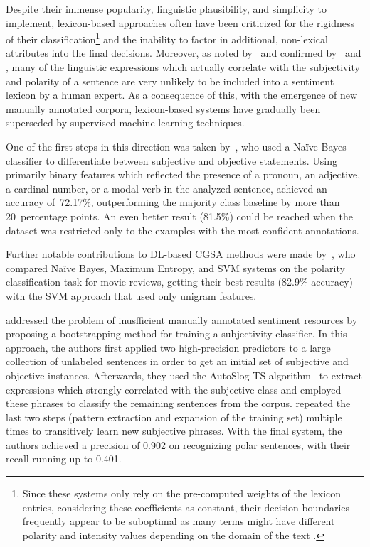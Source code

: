 Despite their immense popularity, linguistic plausibility, and
simplicity to implement, lexicon-based approaches often have been
criticized for the rigidness of their classification\footnote{Since
  these systems only rely on the pre-computed weights of the lexicon
  entries, considering these coefficients as constant, their decision
  boundaries frequently appear to be suboptimal as many terms might
  have different polarity and intensity values depending on the domain
  of the text \cite[see][]{Yang:17}.} and the inability to factor in
additional, non-lexical attributes into the final decisions.
Moreover, as noted by~\citet{Pang:02} and confirmed
by~\citet{Riloff:03} and \citet{Gamon:04}, many of the linguistic
expressions which actually correlate with the subjectivity and
polarity of a sentence are very unlikely to be included into a
sentiment lexicon by a human expert.  As a consequence of this, with
the emergence of new manually annotated corpora, lexicon-based systems
have gradually been superseded by supervised machine-learning
techniques.

One of the first steps in this direction was taken
by~\citet{Wiebe:99}, who used a Na{\"i}ve Bayes classifier to
differentiate between subjective and objective statements.  Using
primarily binary features which reflected the presence of a pronoun,
an adjective, a cardinal number, or a modal verb in the analyzed
sentence, achieved an accuracy of~72.17\%, outperforming the majority
class baseline by more than 20~percentage points.  An even better
result (81.5\%) could be reached when the dataset was restricted only
to the examples with the most confident annotations.


Further notable contributions to DL-based CGSA methods were made
by~\citet{Pang:02}, who compared Na{\"i}ve Bayes, Maximum Entropy, and
SVM systems on the polarity classification task for movie reviews,
getting their best results (82.9\% accuracy) with the SVM approach
that used only unigram features.


\citet{Riloff:03a} addressed the problem of inusfficient manually
annotated sentiment resources by proposing a bootstrapping method for
training a subjectivity classifier.  In this approach, the authors
first applied two high-precision predictors to a large collection of
unlabeled sentences in order to get an initial set of subjective and
objective instances.  Afterwards, they used the AutoSlog-TS
algorithm~\cite{Riloff:96} to extract expressions which strongly
correlated with the subjective class and employed these phrases to
classify the remaining sentences from the corpus.
\citeauthor{Riloff:03a} repeated the last two steps (pattern
extraction and expansion of the training set) multiple times to
transitively learn new subjective phrases.  With the final system, the
authors achieved a precision of 0.902 on recognizing polar sentences,
with their recall running up to 0.401.

